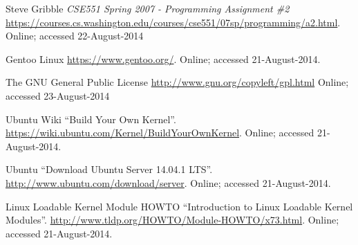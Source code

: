 \documentclass[11pt]{article}
\begin{document}
\begin{thebibliography}{3}

 Steve Gribble
	\newblock \emph{CSE551 Spring 2007 - Programming Assignment \#2}
	\newblock \url{https://courses.cs.washington.edu/courses/cse551/07sp/programming/a2.html}.
	\newblock Online; accessed 22-August-2014 

 Gentoo Linux
	\newblock \url{https://www.gentoo.org/}.
	\newblock Online; accessed 21-August-2014.	
	
 The GNU General Public License
	\newblock \url{http://www.gnu.org/copyleft/gpl.html}
	\newblock Online; accessed 23-August-2014 


 Ubuntu Wiki
  \newblock ``Build Your Own Kernel''.
  \newblock
  \url{https://wiki.ubuntu.com/Kernel/BuildYourOwnKernel}.
  \newblock Online; accessed 21-August-2014.
  
 Ubuntu
  \newblock ``Download Ubuntu Server 14.04.1 LTS''.
  \newblock
  \url{ http://www.ubuntu.com/download/server}.
  \newblock Online; accessed 21-August-2014.
  
 
   
  
 Linux Loadable Kernel Module HOWTO
  \newblock ``Introduction to Linux Loadable Kernel Modules''.
  \newblock
  \url{http://www.tldp.org/HOWTO/Module-HOWTO/x73.html}.
  \newblock Online; accessed 21-August-2014.

\end{thebibliography}
\end{document}
